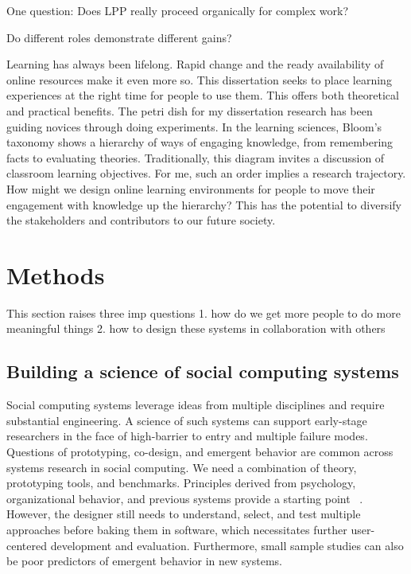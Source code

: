 One question: Does LPP really proceed organically for complex work?

Do different roles demonstrate different gains?


Learning has always been lifelong. Rapid change and the ready availability of online resources make it even more so. This dissertation seeks to place learning experiences at the right time for people to use them. This offers both theoretical and practical benefits. The petri dish for my dissertation research has been guiding novices through doing experiments. In the learning sciences, Bloom’s taxonomy shows a hierarchy of ways of engaging knowledge, from remembering facts to evaluating theories. Traditionally, this diagram invites a discussion of classroom learning objectives. For me, such an order implies a research trajectory. How might we design online learning environments for people to move their engagement with knowledge up the hierarchy? This has the potential to diversify the stakeholders and contributors to our future society. 


\section{Methods} 

This section raises three imp questions
1. how do we get more people to do more meaningful things
2. how to design these systems in collaboration with others

\subsection{Building a science of social computing systems}
Social computing systems leverage ideas from multiple disciplines and require substantial engineering. A science of such systems can support early-stage researchers in the face of high-barrier to entry and multiple failure modes. Questions of prototyping, co-design, and emergent behavior are common across systems research in social computing. We need a combination of theory, prototyping tools, and benchmarks. Principles derived from psychology, organizational behavior, and previous systems provide a starting point ~\cite{fromstatement}. However, the designer still needs to understand, select, and test multiple approaches before baking them in software, which necessitates further user-centered development and evaluation. Furthermore, small sample studies can also be poor predictors of emergent behavior in new systems. 

